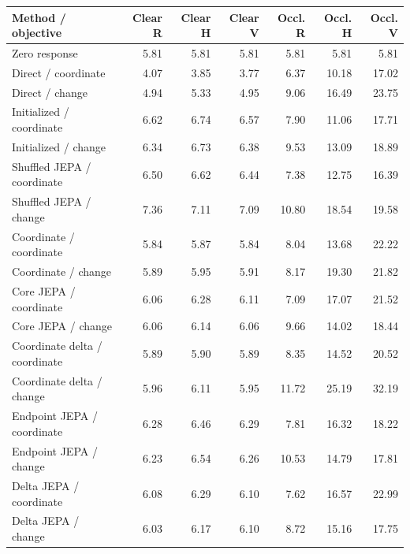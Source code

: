 \begin{tabular}{lrrrrrr}\toprule
Method / objective & Clear R & Clear H & Clear V & Occl. R & Occl. H & Occl. V\\\midrule
Zero response & 5.81 & 5.81 & 5.81 & 5.81 & 5.81 & 5.81 \\
Direct / coordinate & 4.07 & 3.85 & 3.77 & 6.37 & 10.18 & 17.02 \\
Direct / change & 4.94 & 5.33 & 4.95 & 9.06 & 16.49 & 23.75 \\
Initialized / coordinate & 6.62 & 6.74 & 6.57 & 7.90 & 11.06 & 17.71 \\
Initialized / change & 6.34 & 6.73 & 6.38 & 9.53 & 13.09 & 18.89 \\
Shuffled JEPA / coordinate & 6.50 & 6.62 & 6.44 & 7.38 & 12.75 & 16.39 \\
Shuffled JEPA / change & 7.36 & 7.11 & 7.09 & 10.80 & 18.54 & 19.58 \\
Coordinate / coordinate & 5.84 & 5.87 & 5.84 & 8.04 & 13.68 & 22.22 \\
Coordinate / change & 5.89 & 5.95 & 5.91 & 8.17 & 19.30 & 21.82 \\
Core JEPA / coordinate & 6.06 & 6.28 & 6.11 & 7.09 & 17.07 & 21.52 \\
Core JEPA / change & 6.06 & 6.14 & 6.06 & 9.66 & 14.02 & 18.44 \\
Coordinate delta / coordinate & 5.89 & 5.90 & 5.89 & 8.35 & 14.52 & 20.52 \\
Coordinate delta / change & 5.96 & 6.11 & 5.95 & 11.72 & 25.19 & 32.19 \\
Endpoint JEPA / coordinate & 6.28 & 6.46 & 6.29 & 7.81 & 16.32 & 18.22 \\
Endpoint JEPA / change & 6.23 & 6.54 & 6.26 & 10.53 & 14.79 & 17.81 \\
Delta JEPA / coordinate & 6.08 & 6.29 & 6.10 & 7.62 & 16.57 & 22.99 \\
Delta JEPA / change & 6.03 & 6.17 & 6.10 & 8.72 & 15.16 & 17.75 \\
\bottomrule\end{tabular}
